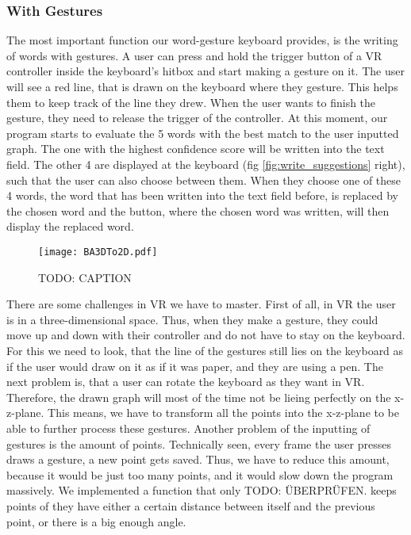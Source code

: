 \subsubsection{With Gestures}
The most important function our word-gesture keyboard provides, is the writing of words with gestures. A user can press and hold the trigger button of a VR controller inside the keyboard's hitbox and start making a gesture on it. The user will see a red line, that is drawn on the keyboard where they gesture. This helps them to keep track of the line they drew. When the user wants to finish the gesture, they need to release the trigger of the controller. At this moment, our program starts to evaluate the 5 words with the best match to the user inputted graph. The one with the highest confidence score will be written into the text field. The other 4 are displayed at the keyboard (fig \ref{fig:write_suggestions} right), such that the user can also choose between them. When they choose one of these 4 words, the word that has been written into the text field before, is replaced by the chosen word and the button, where the chosen word was written, will then display the replaced word.\\
\begin{figure}
    \centering
    \texttt{[image: BA3DTo2D.pdf]}
    \caption{TODO: CAPTION}
    \label{fig:3DTo2D}
    \end{figure}
There are some challenges in VR we have to master. First of all, in VR the user is in a three-dimensional space. Thus, when they make a gesture, they could move up and down with their controller and do not have to stay on the keyboard. For this we need to look, that the line of the gestures still lies on the keyboard as if the user would draw on it as if it was paper, and they are using a pen. The next problem is, that a user can rotate the keyboard as they want in VR. Therefore, the drawn graph will most of the time not be lieing perfectly on the x-z-plane. This means, we have to transform all the points into the x-z-plane to be able to further process these gestures. Another problem of the inputting of gestures is the amount of points. Technically seen, every frame the user presses draws a gesture, a new point gets saved. Thus, we have to reduce this amount, because it would be just too many points, and it would slow down the program massively. We implemented a function that only TODO: ÜBERPRÜFEN. keeps points of they have either a certain distance between itself and the previous point, or there is a big enough angle.

